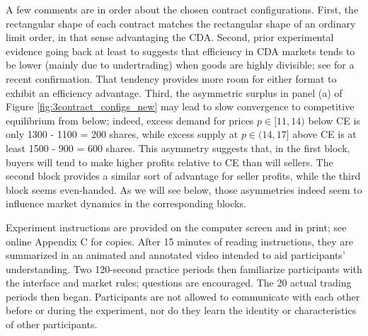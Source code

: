 \documentclass[12pt]{article}
\begin{document}
A few comments are in order about the chosen contract configurations. 
First, the rectangular shape of each contract matches the rectangular shape of an ordinary limit order, in that sense advantaging the CDA. %
Second, prior experimental evidence 
going back at least to \cite{friedman1995competitivity} suggests that efficiency in CDA markets tends to be lower (mainly due to undertrading) when goods are highly divisible; see \cite{angereretal}
for a recent confirmation.
That tendency provides more room for either format to exhibit an efficiency advantage.
Third, the asymmetric surplus in panel (a) of Figure \ref{fig:3contract_configs_new} may lead to slow convergence to competitive equilibrium from below; indeed, excess demand for prices $p \in [11,14)$ below CE is only 1300 - 1100 = 200 shares, while excess supply at $p \in (14, 17]$ above CE is at least 1500 - 900 = 600 shares.
This asymmetry suggests that, in the first block, buyers will tend to make higher profits relative to CE than will sellers.
The second block provides a similar sort of advantage for seller profits, while the third block seems even-handed. As we will see below, those asymmetries indeed seem to influence market dynamics in the corresponding blocks. 


Experiment instructions are provided on the computer screen and in print; see online Appendix C for copies. %
After 15 minutes of reading instructions, they are summarized in an animated and annotated video intended to aid participants' understanding. 
Two 120-second practice periods then familiarize participants with the interface and market rules; questions
are encouraged. 
The 20 actual trading periods then began.
Participants are not allowed to communicate with each other before or during the experiment, nor do they learn the identity or characteristics of other participants.
\end{document}
